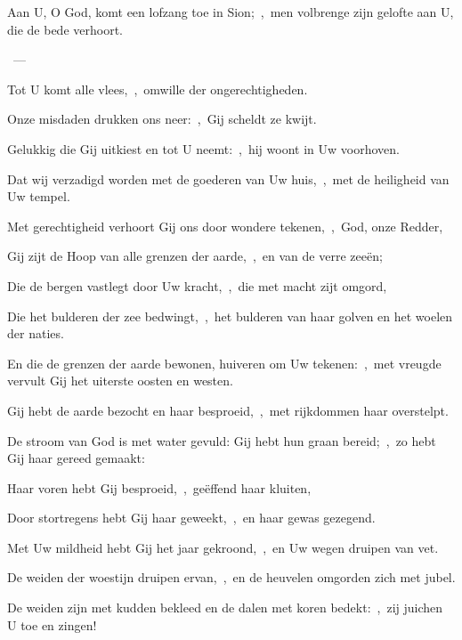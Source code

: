 \documentclass[12pt,twoside,a5paper]{article}
\begin{document}
\begin{halfparskip}
\end{halfparskip}

\begin{halfparskip}
   Aan U, O God, komt een lofzang toe in Sion;~\sep\ men volbrenge zijn gelofte aan U, die de bede verhoort.

  ~--- 

  Tot U komt alle vlees,~\sep\ omwille der ongerechtigheden.

  Onze misdaden drukken ons neer:~\sep\ Gij scheldt ze kwijt.

  Gelukkig die Gij uitkiest en tot U neemt:~\sep\ hij woont in Uw voorhoven.

  Dat wij verzadigd worden met de goederen van Uw huis,~\sep\ met de heiligheid van Uw tempel.

  Met gerechtigheid verhoort Gij ons door wondere tekenen,~\sep\ God, onze Redder,

  Gij zijt de Hoop van alle grenzen der aarde,~\sep\ en van de verre zeeën;

  Die de bergen vastlegt door Uw kracht,~\sep\ die met macht zijt omgord,

  Die het bulderen der zee bedwingt,~\sep\ het bulderen van haar golven en het woelen der naties.

  En die de grenzen der aarde bewonen, huiveren om Uw tekenen:~\sep\ met vreugde vervult Gij het uiterste oosten en westen.

  Gij hebt de aarde bezocht en haar besproeid,~\sep\ met rijkdommen haar overstelpt.

  De stroom van God is met water gevuld: Gij hebt hun graan bereid;~\sep\ zo hebt Gij haar gereed gemaakt:

  Haar voren hebt Gij besproeid,~\sep\ geëffend haar kluiten,

  Door stortregens hebt Gij haar geweekt,~\sep\ en haar gewas gezegend.

  Met Uw mildheid hebt Gij het jaar gekroond,~\sep\ en Uw wegen druipen van vet.

  De weiden der woestijn druipen ervan,~\sep\ en de heuvelen omgorden zich met jubel.

  De weiden zijn met kudden bekleed en de dalen met koren bedekt:~\sep\ zij juichen U toe en zingen!
\end{halfparskip}
\end{document}
